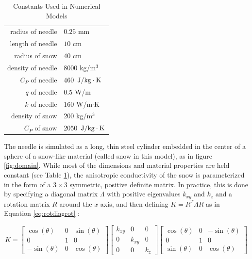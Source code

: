 \begin{table}[h]
\centering
\caption{Constants Used in Numerical Models}
\begin{tabular}{r | l}
radius of needle & \(0.25\) mm\\
length of needle & \(10\) cm\\
radius of snow & \(40\) cm\\
\hline
density of needle & \(8000\) kg/\(\textrm{m}^3\)\\
\(C_P\) of needle & \(460\) \(\left.{\textrm{J}}\middle/{\textrm{kg}\cdot\textrm{K}}\right.\) \\
\(q\) of needle & \(0.5\) W/m\\
\(k\) of needle & \(160\) W/m\(\cdot\)K\\
\hline
density of snow & \(200\) kg/\(\textrm{m}^3\)\\
\(C_P\) of snow & \(2050\)  \(\left.{\textrm{J}}\middle/{\textrm{kg}\cdot\textrm{K}}\right.\)
\end{tabular}
\label{tab:constants}
\end{table}

The needle is simulated as a long, thin steel cylinder embedded in the center
of a sphere of a snow-like material (called snow in this model), as in figure \ref{fig:domain}. While most of the dimensions
and material properties are held constant (see Table \ref{tab:constants}), the
anisotropic conductivity of the snow is parameterized in the form
of a  \(3\times3\) symmetric, positive definite matrix.  In practice, this is
done by specifying a diagonal matrix \(\Lambda\) with positive eigenvalues
\(k_{xy}\) and \(k_z\) and a rotation matrix \(R\) around the \(x\) axis, and
then defining \(K = R^T\Lambda R\) as in Equation \ref{eq:rotdiagrot} :

\begin{equation}
\label{eq:rotdiagrot}
K = \begin{bmatrix}
\cos(\theta) & 0 & \sin(\theta)\\
0 & 1 & 0\\
-\sin(\theta) & 0 &\cos(\theta)
\end{bmatrix}
\begin{bmatrix}
k_{xy} & 0 & 0\\
0 & k_{xy} & 0\\
0 & 0 & k_z
\end{bmatrix}
\begin{bmatrix}
\cos(\theta) & 0 & -\sin(\theta)\\
0 & 1 & 0\\
\sin(\theta) & 0 &\cos(\theta)
\end{bmatrix}
\end{equation}

